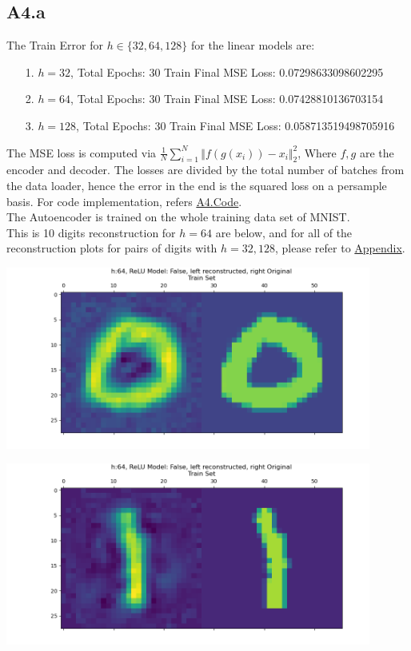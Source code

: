 \documentclass[]{article}
\begin{document}
    \subsection*{A4.a}
        The Train Error for $h\in\{32, 64, 128\}$ for the linear models are: 
        \begin{enumerate}
            \item[1.] $h = 32$, Total Epochs: 30 Train Final MSE Loss: 0.07298633098602295
            \item[2.] $h = 64$, Total Epochs: 30 Train Final MSE Loss: 0.07428810136703154
            \item[3.] $h = 128$, Total Epochs: 30 Train Final MSE Loss: 0.058713519498705916 
        \end{enumerate}
        The MSE loss is computed via $\frac{1}{N}\sum_{i=1}^{N} \Vert f(g(x_i)) - x_i \Vert_2^2$, Where $f, g$ are the encoder and decoder. The losses are divided by the total number of batches from the data loader, hence the error in the end is the squared loss on a persample basis. For code implementation, refers \hyperref[A4.Code]{A4.Code}. 
        \\
        The Autoencoder is trained on the whole training data set of MNIST. 
        \\[1.1em]
        This is 10 digits reconstruction for $h = 64$ are below, and for all of the reconstruction plots for pairs of digits with $h=32, 128$, please refer to \hyperref[extra-a4-lin]{Appendix}.
        \begin{center}
            \includegraphics*[width=12cm]{A4plots/06-43-17-h-64-lin-digit-0.png}
        \end{center}
        \begin{center}
            \includegraphics*[width=12cm]{A4plots/06-43-18-h-64-lin-digit-1.png}
        \end{center}
\end{document}
